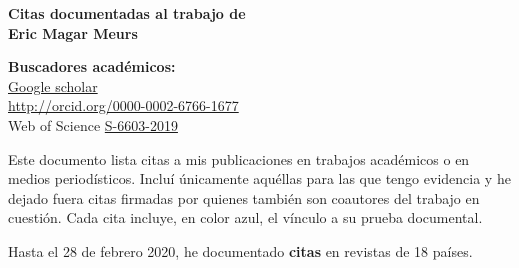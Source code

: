 \documentclass[12 pt, letter]{article}
\begin{document}

\textbf{\LARGE{Citas documentadas al trabajo de \\ Eric Magar Meurs}} \\ [-2ex]
\makebox[\textwidth][r]{\hrulefill}

\begin{footnotesize}
\begin{flushright}
\textbf{Buscadores acad\'emicos:} \\
\href{http://scholar.google.com.mx/citations?user=Rs7pVXQAAAAJ}{Google scholar} \\
\url{http://orcid.org/0000-0002-6766-1677} \\
Web of Science \href{https://publons.com/researcher/1634653/eric-magar/}{S-6603-2019} \\
\end{flushright}
\end{footnotesize}

\bigskip

Este documento lista citas a mis publicaciones en trabajos acad\'emicos o en medios period\'isticos. Inclu\'i \'unicamente aqu\'ellas para las que tengo evidencia y he dejado fuera citas firmadas por quienes tambi\'en son coautores del trabajo en cuesti\'on. Cada cita incluye, en color azul, el v\'inculo a su prueba documental.

\medskip

\noindent Hasta el 28 de febrero 2020, he documentado \textbf{\color{red} 
 citas} en revistas de 18 pa\'ises.
\end{document}
